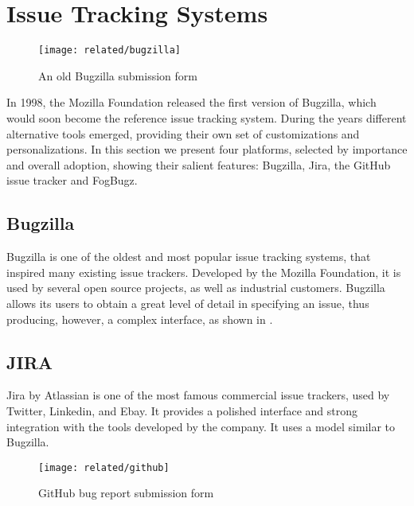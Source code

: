 \section{Issue Tracking Systems}\label{sec:related-bugtrackers}

\begin{figure}[t]
\centering
  \vspace{-12pt}
  \texttt{[image: related/bugzilla]}
  \caption{An old Bugzilla submission form}
  \label{fig:bugzilla-interface}
\end{figure}

In 1998, the Mozilla Foundation released the first version of Bugzilla, which would soon become the reference issue tracking system.
During the years different alternative tools emerged, providing their own set of customizations and personalizations.
In this section we present four platforms, selected by importance and overall adoption, showing their salient features: Bugzilla, Jira, the GitHub issue tracker and FogBugz.


\subsection{Bugzilla}

Bugzilla  is one of the oldest and most popular issue tracking systems, that inspired many existing issue trackers. Developed by the Mozilla Foundation, it is used by several open source projects, as well as industrial customers. Bugzilla allows its users to obtain a great level of detail in specifying an issue, thus producing, however, a complex interface, as shown in .


\subsection{JIRA}

Jira by Atlassian is one of the most famous commercial issue trackers, used by Twitter, Linkedin, and Ebay. It provides a polished interface and strong integration with the tools developed by the company. It uses a model similar to Bugzilla.

\begin{figure}[t]
\centering
 \texttt{[image: related/github]}
 \caption{GitHub bug report submission form}
 \label{fig:github-interface}
\end{figure}

